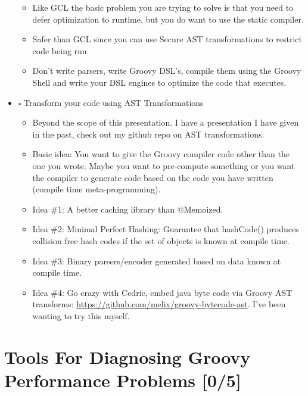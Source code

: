 \documentclass[11pt]{article}
\begin{document}
\begin{itemize}
\begin{itemize}
\item Like GCL the basic problem you are trying to solve is that you need to defer optimization to runtime, but you do want to use the static compiler.

\item Safer than GCL since you can use Secure AST transformations to restrict code being run

\item Don't write parsers, write Groovy DSL's, compile them using the Groovy Shell and write your DSL engines to optimize the code that executes.
\end{itemize}

\item $\square$ Transform your code using AST Transformations

\begin{itemize}
\item Beyond the scope of this presentation. I have a presentation I have given in the past, check out my github repo on AST transformations.

\item Basic idea: You want to give the Groovy compiler code other than the one you wrote. Maybe you want to pre-compute something or you want the compiler to generate code based on the code you have written (compile time meta-programming).

\item Idea \#1: A better caching library than @Memoized.

\item Idea \#2: Minimal Perfect Hashing: Guarantee that hashCode() produces collision free hash codes if the set of objects is known at compile time.

\item Idea \#3: Binary parsers/encoder generated based on data known at compile time.

\item Idea \#4: Go crazy with Cedric, embed java byte code via Groovy AST transforms: \url{https://github.com/melix/groovy-bytecode-ast}. I've been wanting to try this myself.
\end{itemize}
\end{itemize}

\section{Tools For Diagnosing Groovy Performance Problems [0/5]}
\label{sec:orgheadline9}
\end{document}
